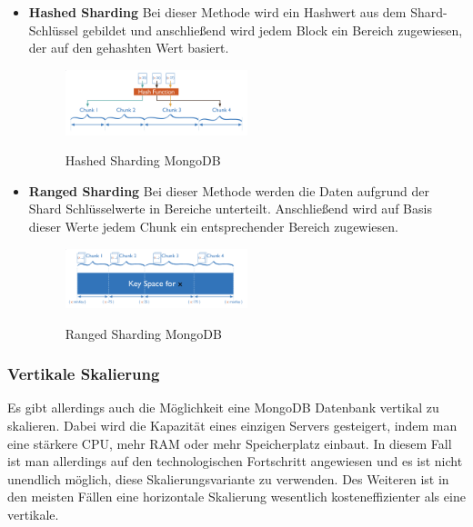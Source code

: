 \begin{itemize}
    \item \textbf{Hashed Sharding}
        \newline
        Bei dieser Methode wird ein Hashwert aus dem Shard-Schlüssel gebildet und anschließend wird jedem Block ein Bereich zugewiesen, der auf den gehashten Wert basiert.
        \begin{figure}[h!]
            \centering
            \includegraphics[width=0.5\textwidth]{pics/hashed_sharding.png}
            \caption{Hashed Sharding MongoDB}
            \cite{hashed_sharding_image}
            \label{fig:enter-label}
        \end{figure}
        \newpage
    \item \textbf{Ranged Sharding}
        \newline
        Bei dieser Methode werden die Daten aufgrund der Shard Schlüsselwerte in Bereiche unterteilt. Anschließend wird auf Basis dieser Werte jedem Chunk ein entsprechender Bereich zugewiesen.
        \begin{figure}[h!]
            \centering
            \includegraphics[width=0.5\textwidth]{pics/ranged_sharding.png}
            \caption{Ranged Sharding MongoDB}
            \cite{range_sharding_image}
            \label{fig:enter-label}
        \end{figure}
\end{itemize}

\subsubsection{Vertikale Skalierung}
Es gibt allerdings auch die Möglichkeit eine MongoDB Datenbank vertikal zu skalieren. Dabei wird die Kapazität eines einzigen Servers gesteigert, indem man eine stärkere CPU, mehr RAM oder mehr Speicherplatz einbaut. In diesem Fall ist man allerdings auf den technologischen Fortschritt angewiesen und es ist nicht unendlich möglich, diese Skalierungsvariante zu verwenden. Des Weiteren ist in den meisten Fällen eine horizontale Skalierung wesentlich kosteneffizienter als eine vertikale.
\cite{mongodb_sharding}

